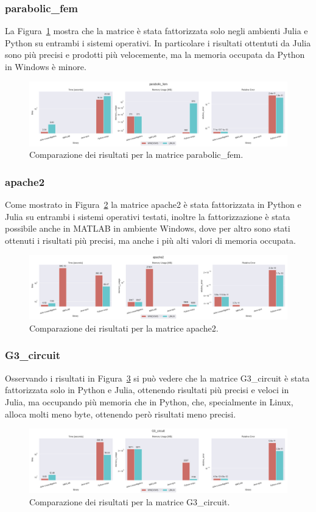 \documentclass[a4paper, 12pt]{article}
\begin{document}
\subsubsection{parabolic\_fem}
La Figura~\ref{fig:parabolic_fem} mostra che la matrice è stata fattorizzata
solo negli ambienti Julia e Python su entrambi i sistemi operativi.
In particolare i risultati ottentuti da Julia sono più precisi e prodotti più
velocemente, ma la memoria occupata da Python in Windows è minore.
\begin{figure}[ht]
\includegraphics[width=\textwidth]{parabolic_fem}
\caption{Comparazione dei risultati per la matrice parabolic\_fem.}
\label{fig:parabolic_fem}
\end{figure}
\subsubsection{apache2}
Come mostrato in Figura~\ref{fig:apache2} la matrice apache2 è stata
fattorizzata in Python e Julia su entrambi i sistemi operativi testati, inoltre
la fattorizzazione è stata possibile anche in MATLAB in ambiente Windows, dove
per altro sono stati ottenuti i risultati più precisi, ma anche i più alti
valori di memoria occupata.
\begin{figure}[ht]
\includegraphics[width=\textwidth]{apache2}
\caption{Comparazione dei risultati per la matrice apache2.}
\label{fig:apache2}
\end{figure}
\subsubsection{G3\_circuit}
Osservando i risultati in Figura~\ref{fig:G3_circuit} si può vedere che la
matrice G3\_circuit è stata fattorizzata solo in Python e Julia, ottenendo
risultati più precisi e veloci in Julia, ma occupando più memoria che in Python,
che, specialmente in Linux, alloca molti meno byte, ottenendo però risultati
meno precisi.
\begin{figure}[ht]
\includegraphics[width=\textwidth]{G3_circuit}
\caption{Comparazione dei risultati per la matrice G3\_circuit.}
\label{fig:G3_circuit}
\end{figure}
\end{document}
